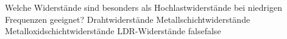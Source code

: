     {Welche Widerstände sind besonders als Hochlastwiderstände bei niedrigen Frequenzen geeignet?}
    {Drahtwiderstände}
    {Metallschichtwiderstände}
    {Metalloxidschichtwiderstände}
    {LDR-Widerstände}
    {false}{false}